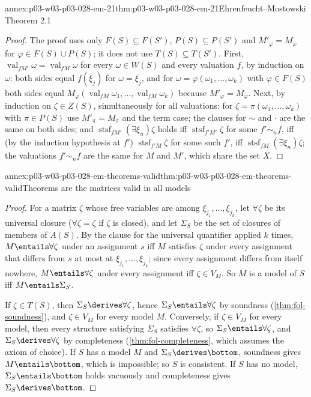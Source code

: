 \begin{annexitem}{annex:p03-w03-p03-028-em-21}{thm:p03-w03-p03-028-em-21}{Ehrenfeucht--Mostowski Theorem 2.1}
\begin{proof}
The proof uses only \(F(S)\subseteq F(S')\), \(P(S)\subseteq P(S')\) and
\(M'_\varphi=M_\varphi\) for \(\varphi\in F(S)\cup P(S)\); it does not use
\(T(S)\subseteq T(S')\).  First, \(\operatorname{val}_{fM'}\omega=
\operatorname{val}_{fM}\omega\) for every \(\omega\in W(S)\) and every
valuation \(f\), by induction on \(\omega\): both sides equal \(f(\xi_j)\) for
\(\omega=\xi_j\), and for \(\omega=\varphi(\omega_1,\ldots,\omega_k)\) with
\(\varphi\in F(S)\) both sides equal
\(M_\varphi(\operatorname{val}_{fM}\omega_1,\ldots,\operatorname{val}_{fM}\omega_k)\)
because \(M'_\varphi=M_\varphi\).  Next, by induction on \(\zeta\in Z(S)\),
simultaneously for all valuations: for \(\zeta=\pi(\omega_1,\ldots,\omega_k)\)
with \(\pi\in P(S)\) use \(M'_\pi=M_\pi\) and the term case; the clauses for
\(\mathord\sim\) and \(\cdot\) are the same on both sides; and
\(\operatorname{stsf}_{fM'}(\exists\xi_n)\zeta\) holds iff
\(\operatorname{stsf}_{f'M'}\zeta\) for some \(f'\sim_nf\), iff (by the
induction hypothesis at \(f'\)) \(\operatorname{stsf}_{f'M}\zeta\) for some
such \(f'\), iff \(\operatorname{stsf}_{fM}(\exists\xi_n)\zeta\); the
valuations \(f'\sim_nf\) are the same for \(M\) and \(M'\), which share the
set \(X\).
\end{proof}
\end{annexitem}

\begin{annexitem}{annex:p03-w03-p03-028-em-theorems-valid}{thm:p03-w03-p03-028-em-theorems-valid}{Theorems are the matrices valid in all models}
\begin{proof}
For a matrix \(\zeta\) whose free variables are among
\(\xi_{j_1},\ldots,\xi_{j_k}\), let \(\forall\zeta\) be its universal closure
(\(\forall\zeta=\zeta\) if \(\zeta\) is closed), and let \(\Sigma_S\) be the set
of closures of members of \(A(S)\).  By the clause for the universal quantifier
applied \(k\) times, \(M\entails\forall\zeta\) under an assignment \(s\) iff
\(M\) satisfies \(\zeta\) under every assignment that differs from \(s\) at
most at \(\xi_{j_1},\ldots,\xi_{j_k}\); since every assignment differs from
itself nowhere, \(M\entails\forall\zeta\) under every assignment iff
\(\zeta\in V_M\).  So \(M\) is a model of \(S\) iff \(M\entails\Sigma_S\).

If \(\zeta\in T(S)\), then \(\Sigma_S\derives\forall\zeta\), hence
\(\Sigma_S\entails\forall\zeta\) by soundness (\cref{thm:fol-soundness}), and
\(\zeta\in V_M\) for every model \(M\).  Conversely, if \(\zeta\in V_M\) for
every model, then every structure satisfying \(\Sigma_S\) satisfies
\(\forall\zeta\), so \(\Sigma_S\entails\forall\zeta\), and
\(\Sigma_S\derives\forall\zeta\) by completeness
(\cref{thm:fol-completeness}, which assumes the axiom of choice).  If
\(S\) has a model \(M\) and \(\Sigma_S\derives\bottom\), soundness gives
\(M\entails\bottom\), which is impossible; so \(S\) is consistent.  If \(S\) has
no model, \(\Sigma_S\entails\bottom\) holds vacuously and completeness gives
\(\Sigma_S\derives\bottom\).
\end{proof}
\end{annexitem}

